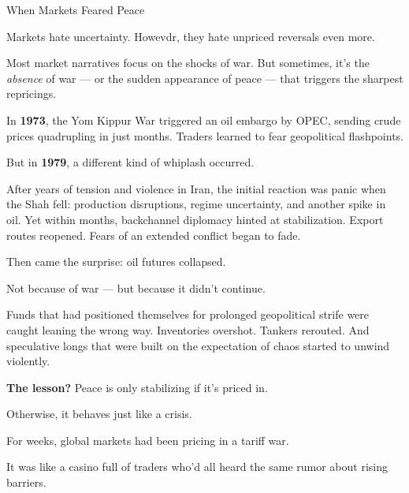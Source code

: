 \begin{HistoricalSidebar}{When Markets Feared Peace}

  Markets hate uncertainty. Howevdr, they hate unpriced reversals even more.

  \medskip
  
  Most market narratives focus on the shocks of war. But sometimes, it’s the \textit{absence} of war — or the sudden 
  appearance of peace — that triggers the sharpest repricings.

  \medskip
  
  In \textbf{1973}, the Yom Kippur War triggered an oil embargo by OPEC, sending crude prices quadrupling in just months. 
  Traders learned to fear geopolitical flashpoints.

  \medskip
  
  But in \textbf{1979}, a different kind of whiplash occurred.

  \medskip
  
  After years of tension and violence in Iran, the initial reaction was panic when the Shah fell: 
  production disruptions, 
  regime uncertainty, and another spike in oil. Yet within months, backchannel diplomacy hinted 
  at stabilization. Export 
  routes reopened. Fears of an extended conflict began to fade.

  \medskip
  
  Then came the surprise: oil futures collapsed.

  \medskip
  
  Not because of war — but because it didn’t continue.

  \medskip
  
  Funds that had positioned themselves for prolonged geopolitical strife were caught leaning the wrong way. Inventories 
  overshot. Tankers rerouted. And speculative longs that were built on the expectation of chaos started to unwind 
  violently.
  
  \medskip
  
  \textbf{The lesson?} Peace is only stabilizing if it’s priced in.

  \medskip
  
  Otherwise, it behaves just like a crisis.
  
\end{HistoricalSidebar}

For weeks, global markets had been pricing in a tariff war. 

It was like a casino full of traders who'd all heard the same rumor about rising barriers.  

